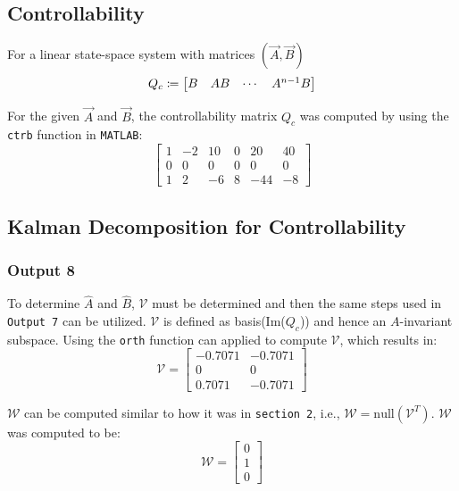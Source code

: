 \documentclass[10pt]{article}
\begin{document}
\subsection{Controllability}
For a linear state-space system with matrices $(\vec{A},\vec{B})$
\[
    Q_c \coloneqq \begin{bmatrix} B & AB & \cdots & A^{n-1}B \end{bmatrix}
\]

For the given $\vec{A}$ and $\vec{B}$, the controllability matrix $Q_c$ was computed by using the \texttt{ctrb} function in \texttt{MATLAB}:
\begin{equation*}
    \begin{bmatrix}
        1 & -2 & 10 & 0 & 20 & 40 \\
        0 & 0 & 0 & 0 & 0 & 0 \\
        1 & 2 & -6 & 8 & -44 & -8
    \end{bmatrix}
\end{equation*}

\subsection{Kalman Decomposition for Controllability}
\subsubsection{Output 8}
To determine $\hat{A}$ and $\hat{B}$, $\mathcal{V}$ must be determined and then the same steps used in \texttt{Output 7} can be utilized. $\mathcal{V}$ is defined as basis(Im($Q_c$)) and hence an $A$-invariant subspace. Using the \texttt{orth} function can applied to compute $\mathcal{V}$, which results in:
\begin{equation*}
    \mathcal{V} = \begin{bmatrix}
        -0.7071 & -0.7071 \\
        0 & 0 \\ 
        0.7071 & -0.7071
    \end{bmatrix}
\end{equation*}

$\mathcal{W}$ can be computed similar to how it was in \texttt{section 2}, i.e., $\mathcal{W} = \text{null}(\mathcal{V}^T)$. $\mathcal{W}$ was computed to be:
\begin{equation*}
    \mathcal{W} = 
        \begin{bmatrix}
            0\\1\\0
        \end{bmatrix}
\end{equation*}
\end{document}

